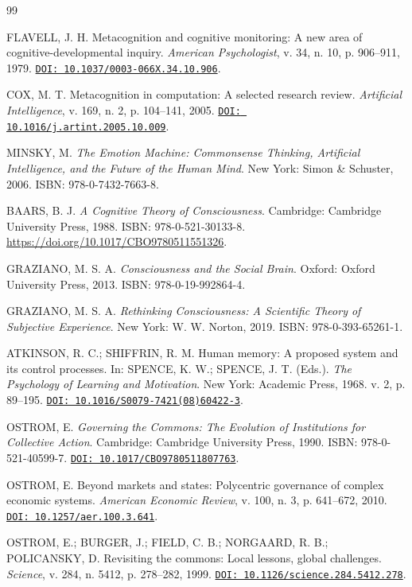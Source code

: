 \documentclass[12pt,a4paper,oneside]{abntex2}
\newcommand{\doi}[1]{\href{https://doi.org/#1}{\texttt{DOI: #1}}}
\begin{document}
\begin{thebibliography}{99}

FLAVELL, J. H. Metacognition and cognitive monitoring: A new area of cognitive-developmental inquiry. \textit{American Psychologist}, v. 34, n. 10, p. 906--911, 1979. \doi{10.1037/0003-066X.34.10.906}.

COX, M. T. Metacognition in computation: A selected research review. \textit{Artificial Intelligence}, v. 169, n. 2, p. 104--141, 2005. \doi{10.1016/j.artint.2005.10.009}.

MINSKY, M. \textit{The Emotion Machine: Commonsense Thinking, Artificial Intelligence, and the Future of the Human Mind}. New York: Simon \& Schuster, 2006. ISBN: 978-0-7432-7663-8.

BAARS, B. J. \textit{A Cognitive Theory of Consciousness}. Cambridge: Cambridge University Press, 1988. ISBN: 978-0-521-30133-8. \url{https://doi.org/10.1017/CBO9780511551326}.

GRAZIANO, M. S. A. \textit{Consciousness and the Social Brain}. Oxford: Oxford University Press, 2013. ISBN: 978-0-19-992864-4.

GRAZIANO, M. S. A. \textit{Rethinking Consciousness: A Scientific Theory of Subjective Experience}. New York: W. W. Norton, 2019. ISBN: 978-0-393-65261-1.

ATKINSON, R. C.; SHIFFRIN, R. M. Human memory: A proposed system and its control processes. In: SPENCE, K. W.; SPENCE, J. T. (Eds.). \textit{The Psychology of Learning and Motivation}. New York: Academic Press, 1968. v. 2, p. 89--195. \doi{10.1016/S0079-7421(08)60422-3}.

OSTROM, E. \textit{Governing the Commons: The Evolution of Institutions for Collective Action}. Cambridge: Cambridge University Press, 1990. ISBN: 978-0-521-40599-7. \doi{10.1017/CBO9780511807763}.

OSTROM, E. Beyond markets and states: Polycentric governance of complex economic systems. \textit{American Economic Review}, v. 100, n. 3, p. 641--672, 2010. \doi{10.1257/aer.100.3.641}.

OSTROM, E.; BURGER, J.; FIELD, C. B.; NORGAARD, R. B.; POLICANSKY, D. Revisiting the commons: Local lessons, global challenges. \textit{Science}, v. 284, n. 5412, p. 278--282, 1999. \doi{10.1126/science.284.5412.278}.


\end{thebibliography}
\end{document}
